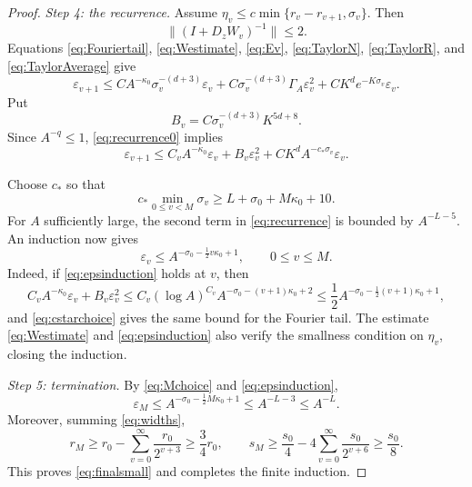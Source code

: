 \documentclass[10pt,a4paper]{amsart}
\newcommand{\eps}{\varepsilon}
\newcommand{\norm}[1]{\lVert #1\rVert}
\begin{document}
\begin{proof}
\smallskip
\noindent\emph{Step 4: the recurrence.}
Assume $\eta_v\leq c\min\{r_v-r_{v+1},\sigma_v\}$.
Then
\[
 \norm{(I+D_zW_v)^{-1}}\leq2.
\]
Equations \eqref{eq:Fouriertail},
\eqref{eq:Westimate}, \eqref{eq:Ev},
\eqref{eq:TaylorN}, \eqref{eq:TaylorR}, and
\eqref{eq:TaylorAverage} give
\begin{equation}\label{eq:recurrence0}
 \eps_{v+1}
 \leq
 C A^{-\kappa_0}\sigma_v^{-(d+3)}\eps_v
 +C\sigma_v^{-(d+3)}\Gamma_A\eps_v^2
 +C K^d e^{-K\sigma_v}\eps_v.
\end{equation}
Put
\begin{equation}\label{eq:Bv}
 B_v=C\sigma_v^{-(d+3)}K^{5d+8}.
\end{equation}
Since $A^{-q}\leq1$, \eqref{eq:recurrence0} implies
\begin{equation}\label{eq:recurrence}
 \eps_{v+1}
 \leq C_vA^{-\kappa_0}\eps_v
 +B_v\eps_v^2
 +CK^dA^{-c_*\sigma_v}\eps_v.
\end{equation}

Choose $c_*$ so that
\begin{equation}\label{eq:cstarchoice}
 c_*\min_{0\leq v<M}\sigma_v\geq L+\sigma_0+M\kappa_0+10.
\end{equation}
For $A$ sufficiently large, the second term in
\eqref{eq:recurrence} is bounded by $A^{-L-5}$.
An induction now gives
\begin{equation}\label{eq:epsinduction}
 \eps_v\leq A^{-\sigma_0-\frac12v\kappa_0+1},
 \qquad 0\leq v\leq M.
\end{equation}
Indeed, if \eqref{eq:epsinduction} holds at $v$, then
\[
 C_vA^{-\kappa_0}\eps_v+B_v\eps_v^2
 \leq
 C_v(\log A)^{C_v}
 A^{-\sigma_0-(v+1)\kappa_0+2}
 \leq
 \frac12A^{-\sigma_0-\frac12(v+1)\kappa_0+1},
\]
and \eqref{eq:cstarchoice} gives the same bound for the Fourier tail.
The estimate \eqref{eq:Westimate} and \eqref{eq:epsinduction} also verify
the smallness condition on $\eta_v$, closing the induction.

\smallskip
\noindent\emph{Step 5: termination.}
By \eqref{eq:Mchoice} and \eqref{eq:epsinduction},
\[
 \eps_M\leq
 A^{-\sigma_0-\frac12M\kappa_0+1}
 \leq A^{-L-3}\leq A^{-L}.
\]
Moreover, summing \eqref{eq:widths},
\[
 r_M\geq r_0-\sum_{v=0}^{\infty}\frac{r_0}{2^{v+3}}
 \geq\frac34r_0,
\qquad
 s_M\geq\frac{s_0}{4}
 -4\sum_{v=0}^{\infty}\frac{s_0}{2^{v+6}}
 \geq\frac{s_0}{8}.
\]
This proves \eqref{eq:finalsmall} and completes the finite induction.
\end{proof}
\end{document}
